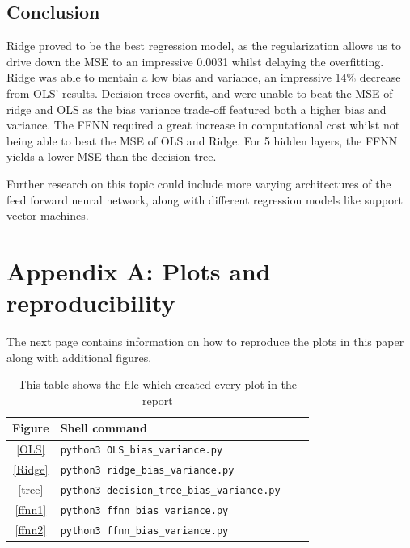 \documentclass[onecolumn,10pt,cleanfoot]{asme2ej}
\begin{document}
\subsection{Conclusion}
Ridge proved to be the best regression model, as the regularization allows us to drive down the MSE to an impressive 0.0031 whilst delaying the overfitting. Ridge was able to mentain a low bias and variance, an impressive 14\% decrease from OLS' results. Decision trees overfit, and were unable to beat the MSE of ridge and OLS as the bias variance trade-off featured both a higher bias and variance. The FFNN required a great increase in computational cost whilst not being able to beat the MSE of OLS and Ridge. For 5 hidden layers, the FFNN yields a lower MSE than the decision tree.

Further research on this topic could include more varying architectures of the feed forward neural network, along with different regression models like support vector machines.




\section*{Appendix A: Plots and reproducibility}

The next page contains information on how to reproduce the plots in this paper along with additional figures.

\begin{table}[h]
\caption{This table shows the file which created every plot in the report}
\begin{center}
\label{allparamstable}
\begin{tabular}{c | l l l}
Figure & Shell command \\
\hline
\ref{OLS} & \texttt{python3 OLS\_bias\_variance.py}\\
\ref{Ridge} & \texttt{python3 ridge\_bias\_variance.py}\\
\ref{tree} & \texttt{python3 decision\_tree\_bias\_variance.py}\\
\ref{ffnn1} & \texttt{python3 ffnn\_bias\_variance.py}\\
\ref{ffnn2} & \texttt{python3 ffnn\_bias\_variance.py}\\
\hline
\end{tabular}
\end{center}
\end{table}
\end{document}

